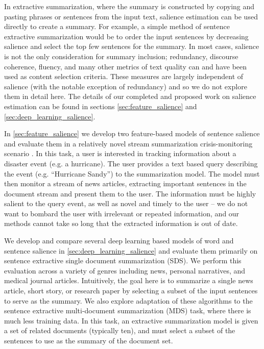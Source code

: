 In extractive summarization, 
where the summary is constructed by copying and pasting phrases or sentences 
from the input text, salience estimation can be used directly to create
a summary. For example, a simple method of sentence extractive summarization
would be to order the input sentences by decreasing salience and select the
top few sentences for the summary. In most cases, salience is not the only
consideration for summary inclusion; redundancy, discourse coherence, fluency,
and many other metrics of text quality can and have been used as content
selection criteria. These measures are largely independent of salience 
(with the notable exception of redundancy) and so we do not explore them in 
detail here. The details of our completed and proposed work on 
salience estimation can be found
in sections \ref{sec:feature_salience} and \ref{sec:deep_learning_salience}.

In \autoref{sec:feature_salience} we develop two feature-based models of 
sentence
salience and evaluate them in a relatively novel stream 
summarization crisis-monitoring scenario
\citep{starbird2013working,aslam2015trec,aslam2016trec}. In this task, a user is interested
in tracking information about a disaster event (e.g. a hurricane). The
user provides a text based query describing the event 
(e.g. ``Hurricane Sandy'') to the summarization model. 
The model must then 
monitor a stream of news articles, extracting important sentences in the 
document stream and present them to the user. The information must be 
highly salient to the query event, as well as novel and timely to the user 
-- we do not want to bombard the user with irrelevant or repeated information,
and our methods cannot take so long  that the extracted
information is out of date.
  
We develop and compare several deep learning based models of word and 
sentence salience in \autoref{sec:deep_learning_salience} and evaluate them 
primarily on
sentence extractive single document summarization (SDS). 
We perform this evaluation across
a variety of genres including news, personal narratives, and medical journal
articles. Intuitively, the goal here is to summarize a single news article, 
short story, or research paper by selecting a subset of the input sentences
to serve as the summary. We also explore adaptation of these algorithms to 
the sentence extractive multi-document summarization (MDS) task, 
where there is much less training data.
In this task, an extractive summarization model is given a set of related 
documents 
(typically ten), and must select a subset of the sentences to use as the summary of
the document set.

